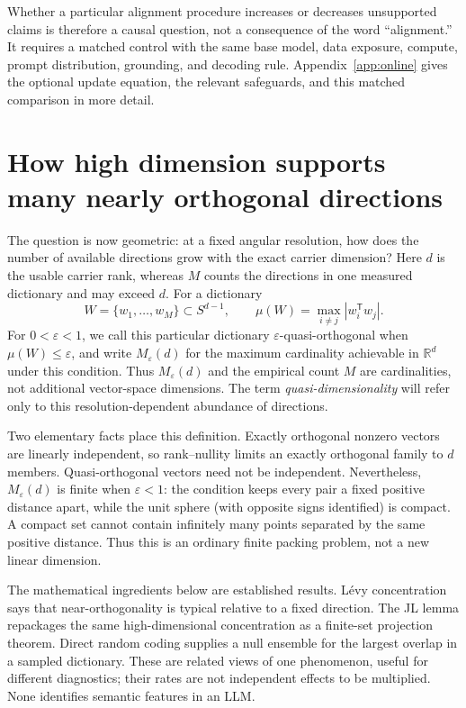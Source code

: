 \documentclass[
  aps,
  reprint,
  superscriptaddress,
  floatfix,
  nofootinbib,
  longbibliography
]{revtex4-2}
\newcommand{\R}{\mathbb{R}}
\newcommand{\Sph}[1]{S^{#1}}
\newcommand{\Msem}{M}
\newcommand{\T}{^{\mathsf{T}}}
\begin{document}
Whether a particular alignment procedure increases or decreases unsupported
claims is therefore a causal question, not a consequence of the word
``alignment.''  It requires a matched control with the same base model, data
exposure, compute, prompt distribution, grounding, and decoding rule.
Appendix~\ref{app:online} gives the optional update equation, the relevant
safeguards, and this matched comparison in more detail.

\section{How high dimension supports many nearly orthogonal directions}
\label{sec:concentration}

The question is now geometric: at a fixed angular resolution, how does the
number of available directions grow with the exact carrier dimension?  Here
$d$ is the usable carrier rank, whereas $\Msem$ counts the directions in one
measured dictionary and may exceed $d$.  For a dictionary
\begin{equation}
\label{eq:quasiortho}
W=\{w_1,\ldots,w_{\Msem}\}\subset\Sph{d-1},
\qquad
\mu(W)=\max_{i\ne j}|w_i\T w_j|.
\end{equation}
For $0<\varepsilon<1$, we call this particular dictionary
$\varepsilon$-quasi-orthogonal when $\mu(W)\leq\varepsilon$, and write
$M_\varepsilon(d)$ for the maximum cardinality achievable in $\R^d$ under
this condition.  Thus
$M_\varepsilon(d)$ and the empirical count $\Msem$ are cardinalities, not
additional vector-space dimensions.  The term \emph{quasi-dimensionality}
will refer only to this resolution-dependent abundance of directions.

Two elementary facts place this definition.  Exactly orthogonal nonzero
vectors are linearly independent, so rank--nullity limits an exactly
orthogonal family to $d$ members.  Quasi-orthogonal vectors need not be
independent.  Nevertheless, $M_\varepsilon(d)$ is finite when
$\varepsilon<1$: the condition keeps every pair a fixed positive distance
apart, while the unit sphere (with opposite signs identified) is compact.  A
compact set cannot contain infinitely many points separated by the same
positive distance.  Thus this is an ordinary finite packing problem, not a new
linear dimension.

The mathematical ingredients below are established results.  L\'evy
concentration says that near-orthogonality is typical relative to a fixed
direction.  The JL lemma repackages the same high-dimensional concentration as
a finite-set projection theorem.  Direct random coding supplies a null
ensemble for the largest overlap in a sampled dictionary.  These are related
views of one phenomenon, useful for different diagnostics; their rates are not
independent effects to be multiplied.  None identifies semantic features in
an LLM.
\end{document}
